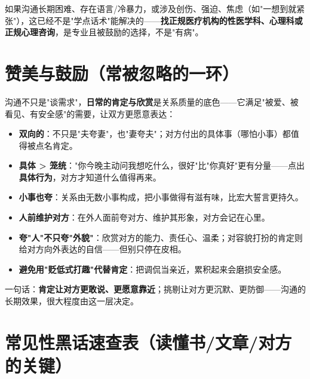 \documentclass[12pt,UTF8,openany]{ctexbook}
\begin{document}
如果沟通长期困难、存在语言/冷暴力，或涉及创伤、强迫、焦虑（如"一想到就紧张"），这已经不是"学点话术"能解决的——\textbf{找正规医疗机构的性医学科、心理科或正规心理咨询}，是专业且被鼓励的选择，不是"有病"。

\section{赞美与鼓励（常被忽略的一环）}

\noindent 沟通不只是"谈需求"，\textbf{日常的肯定与欣赏}是关系质量的底色——它满足"被爱、被看见、有安全感"的需要，让双方更愿意表达：

\begin{itemize}[leftmargin=2em,itemsep=0.3em]
  \item \textbf{双向的}：不只是"夫夸妻"，也"妻夸夫"；对方付出的具体事（哪怕小事）都值得被点名肯定。
  \item \textbf{具体 > 笼统}："你今晚主动问我想吃什么，很好"比"你真好"更有分量——点出\textbf{具体行为}，对方才知道什么值得再来。
  \item \textbf{小事也夸}：关系由无数小事构成，把小事做得有滋有味，比宏大誓言更持久。
  \item \textbf{人前维护对方}：在外人面前夸对方、维护其形象，对方会记在心里。
  \item \textbf{夸"人"不只夸"外貌"}：欣赏对方的能力、责任心、温柔；对容貌打扮的肯定则给对方向外表达的自信——但别只停在皮相。
  \item \textbf{避免用"贬低式打趣"代替肯定}：把调侃当亲近，累积起来会磨损安全感。
\end{itemize}

\noindent 一句话：\textbf{肯定让对方更敢说、更愿意靠近}；挑剔让对方更沉默、更防御——沟通的长期效果，很大程度由这一层决定。

\section{常见性黑话速查表（读懂书/文章/对方的关键）}
\end{document}
